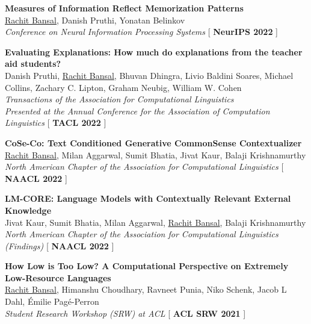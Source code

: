 \documentclass[10pt,letterpaper]{article}
\begin{document}
\begin{enumerate}[label={[\arabic*]}]
    \item \textbf{Measures of Information Reflect Memorization Patterns} \\
    \underline{Rachit Bansal}, Danish Pruthi, Yonatan Belinkov \\
    \textit{Conference on Neural Information Processing Systems} \hfill [ \textbf{NeurIPS 2022} ]

    \item \textbf{Evaluating Explanations: How much do explanations from the teacher aid students?} \\
    Danish Pruthi, \underline{Rachit Bansal}, Bhuvan Dhingra, Livio Baldini Soares, Michael Collins, Zachary C. Lipton, Graham Neubig, William W. Cohen \\
    \textit{Transactions of the Association for Computational Linguistics} \\
    \textit{Presented at the Annual Conference for the Association of Computation Linguistics} \hfill [ \textbf{TACL 2022} ]

    \item \textbf{CoSe-Co: Text Conditioned Generative CommonSense Contextualizer} \\
    \underline{Rachit Bansal}, Milan Aggarwal, Sumit Bhatia, Jivat Kaur, Balaji Krishnamurthy \\
    \textit{North American Chapter of the Association for Computational Linguistics} \hfill [ \textbf{NAACL 2022} ]

    \item \textbf{LM-CORE: Language Models with Contextually Relevant External Knowledge} \\
    Jivat Kaur, Sumit Bhatia, Milan Aggarwal, \underline{Rachit Bansal}, Balaji Krishnamurthy \\
    \textit{North American Chapter of the Association for Computational Linguistics (Findings)} \hfill [ \textbf{NAACL 2022} ]

    \item \textbf{How Low is Too Low? A Computational Perspective on Extremely Low-Resource Languages} \\
    \underline{Rachit Bansal}, Himanshu Choudhary, Ravneet Punia, Niko Schenk, Jacob L Dahl, \'Emilie Pag\'e-Perron \\
    \textit{Student Research Workshop (SRW) at ACL} \hfill [ \textbf{ACL SRW 2021} ]
\end{enumerate}
\end{document}
